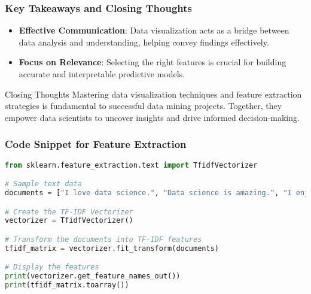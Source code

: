\documentclass[aspectratio=169]{beamer}
\begin{document}
\begin{frame}[fragile]
    \frametitle{Key Takeaways and Closing Thoughts}
    \begin{itemize}
        \item \textbf{Effective Communication}: Data visualization acts as a bridge between data analysis and understanding, helping convey findings effectively.
        \item \textbf{Focus on Relevance}: Selecting the right features is crucial for building accurate and interpretable predictive models.
    \end{itemize}
    
    \begin{block}{Closing Thoughts}
        Mastering data visualization techniques and feature extraction strategies is fundamental to successful data mining projects. Together, they empower data scientists to uncover insights and drive informed decision-making.
    \end{block}
\end{frame}

\begin{frame}[fragile]
    \frametitle{Code Snippet for Feature Extraction}
    \begin{lstlisting}[language=Python]
from sklearn.feature_extraction.text import TfidfVectorizer

# Sample text data
documents = ["I love data science.", "Data science is amazing.", "I enjoy exploring data."]

# Create the TF-IDF Vectorizer
vectorizer = TfidfVectorizer()

# Transform the documents into TF-IDF features
tfidf_matrix = vectorizer.fit_transform(documents)

# Display the features
print(vectorizer.get_feature_names_out())
print(tfidf_matrix.toarray())
    \end{lstlisting}
\end{frame}
\end{document}
